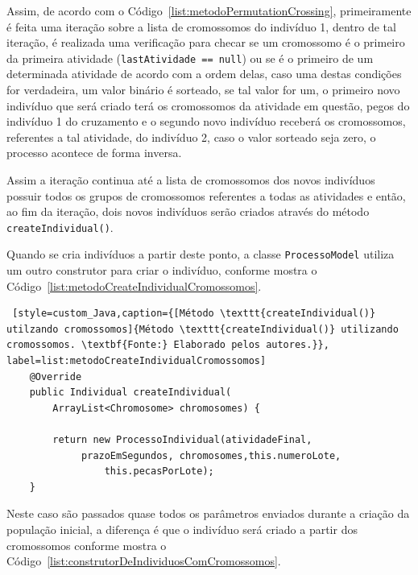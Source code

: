\par Assim, de acordo com o Código~\ref{list:metodoPermutationCrossing}, primeiramente é feita uma iteração sobre a lista de cromossomos do indivíduo 1, dentro de tal iteração, é realizada uma verificação para checar se um cromossomo é o primeiro da primeira atividade (\texttt{lastAtividade == null}) ou se é o primeiro de um determinada atividade de acordo com a ordem delas, caso uma destas condições for verdadeira, um valor binário é sorteado, se tal valor for um, o primeiro novo indivíduo que será criado terá os cromossomos da atividade em questão, pegos do indivíduo 1 do cruzamento e o segundo novo indivíduo receberá os cromossomos, referentes a tal atividade, do indivíduo 2, caso o valor sorteado seja zero, o processo acontece de forma inversa. 

\par Assim a iteração continua até a lista de cromossomos dos novos indivíduos possuir todos os grupos de cromossomos referentes a todas as atividades e então, ao fim da iteração, dois novos indivíduos serão criados através do método \texttt{createIndividual()}.

\par Quando se cria indivíduos a partir deste ponto, a classe \texttt{ProcessoModel} utiliza um outro construtor para criar o indivíduo, conforme mostra o Código~\ref{list:metodoCreateIndividualCromossomos}.


\begin{lstlisting} [style=custom_Java,caption={[Método \texttt{createIndividual()} utilzando cromossomos]{Método \texttt{createIndividual()} utilizando cromossomos. \textbf{Fonte:} Elaborado pelos autores.}}, label=list:metodoCreateIndividualCromossomos] 
	@Override
	public Individual createIndividual(
		ArrayList<Chromosome> chromosomes) {
		
		return new ProcessoIndividual(atividadeFinal,
			 prazoEmSegundos, chromosomes,this.numeroLote,
				 this.pecasPorLote);
	}

\end{lstlisting}

\par Neste caso são passados quase todos os parâmetros enviados durante a criação
da população inicial, a diferença é que o indivíduo será criado a partir 
dos cromossomos conforme mostra o Código~\ref{list:construtorDeIndividuosComCromossomos}.

